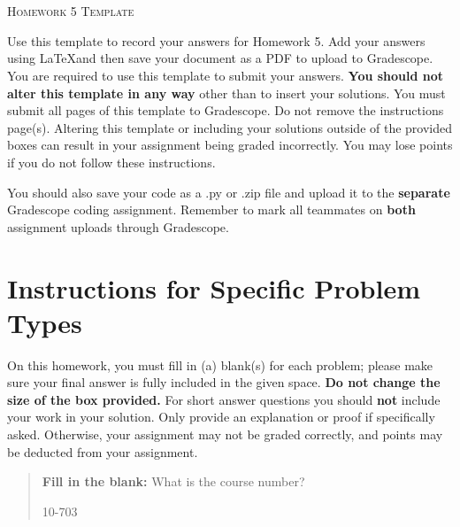 \documentclass[12pt]{article}
\begin{document}
\section*{}
\begin{center}
  \centerline{\textsc{\LARGE  Homework 5 Template}}
\end{center}

Use this template to record your answers for Homework 5.  Add your answers using \LaTeX and then save your document as a PDF to upload to Gradescope.  You are required to use this template to submit your answers.  \textbf{You should not alter this template in any way} other than to insert your solutions.  You must submit all \pageref{LastPage} pages of this template to Gradescope.  Do not remove the instructions page(s).  Altering this template or including your solutions outside of the provided boxes can result in your assignment being graded incorrectly.  You may lose points if you do not follow these instructions.

You should also save your code as a .py or .zip file and upload it to the \textbf{separate} Gradescope coding assignment. Remember to mark all teammates on \textbf{both} assignment uploads through Gradescope.

\section*{Instructions for Specific Problem Types}

On this homework, you must fill in (a) blank(s) for each problem; please make sure your final answer is fully included in the given space.  \textbf{Do not change the size of the box provided.}  For short answer questions you should \textbf{not} include your work in your solution.  Only provide an explanation or proof if specifically asked.  Otherwise, your assignment may not be graded correctly, and points may be deducted from your assignment.

\begin{quote}
\textbf{Fill in the blank:} What is the course number?

\begin{tcolorbox}[fit,height=1cm, width=4cm, blank, borderline={1pt}{-2pt},valign=center,nobeforeafter]
    \begin{center}\huge10-703\end{center}
    \end{tcolorbox}
\end{quote}

\newpage
\end{document}
